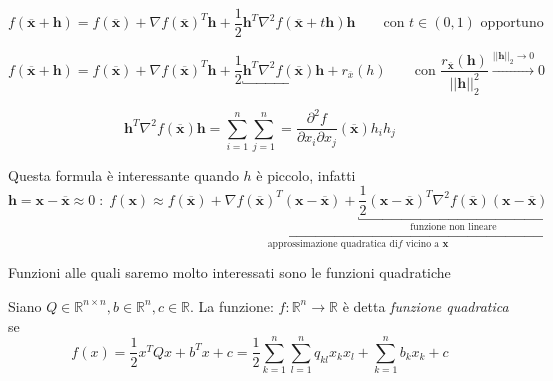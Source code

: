 \begin{defn}
 $$f(\overline{\mathbf{x}}+\mathbf{h}) = f(\overline{\mathbf{x}}) +
 \nabla f(\overline{\mathbf{x}})^T\mathbf{h} + 
 \frac{1}{2}  \mathbf{h}^T \nabla^{2} f(\overline{\mathbf{x}} +
 t  \mathbf{h}) \mathbf{h}
\qquad
\text{con } t \in (0,1) \text{ opportuno}
$$
\end{defn}

\begin{defn}
 $$f(\overline{\mathbf{x}}+\mathbf{h}) = 
f(\overline{\mathbf{x}}) +
 \nabla f(\overline{\mathbf{x}})^T\mathbf{h} + 
 \frac{1}{2} 
\underbracket{ \mathbf{h}^T \nabla^{2} f(\overline{\mathbf{x}}) \mathbf{h}}_{}
+ r_{\overline{x}}(h)
\qquad
\text{con } \dfrac{r_{\overline{\mathbf{x}}}(\mathbf{h})}{||\mathbf{h}||_{2}^{2}}
\xrightarrow{||\mathbf{h}||_{2} \to 0} 0
$$

$$\mathbf{h}^{T} \nabla^{2} f(\overline{\mathbf{x}}) \mathbf{h} =
 \displaystyle \sum_{i=1}^{n} \displaystyle \sum_{j=1}^{n}
 = \frac{{\partial}^2 f}
{{\partial} x_i {\partial} x_j}
(\overline{\mathbf{x}}) h_i h_j$$
\end{defn}
Questa formula è interessante quando $h$ è piccolo, infatti
$$ 
\mathbf{h} = \mathbf{x} - \overline{\mathbf{x}} \approx 0
\; : \;
f(\mathbf{x}) \approx
\underbracket{ f(\overline{\mathbf{x}}) + \nabla f(\overline{\mathbf{x}})^{T} (\mathbf{x}-\overline{\mathbf{x}}) + 
 \underbracket{\frac{1}{2}(\mathbf{x}- \overline{\mathbf{x}})^{T}\nabla^{2} f(\overline{\mathbf{x}})(\mathbf{x}-\overline{\mathbf{x}})}_{\text{funzione non lineare}}}_{\text{approssimazione quadratica di} f  \text{ vicino a } \mathbf{x}} $$

Funzioni alle quali saremo molto interessati sono le funzioni quadratiche
\begin{defn}
Siano $ Q \in \mathbb{R}^{n \times n}, b \in \mathbb{R}^{n}, c \in \mathbb{R} $.
La funzione: $f: \mathbb{R}^{n} \rightarrow \mathbb{R}$ \`e detta
\emph{funzione quadratica} se 
 $$ 
f(x) =  \frac{1}{2} x^{T} Q x + b^{T}x + c 
=
\frac{1}{2} 
 \displaystyle \sum_{k=1}^{n} \displaystyle \sum_{l=1}^{n}
q_{kl} x_{k}x_{l} + \displaystyle \sum_{k=1}^{n} b_k x_k + c
$$
\end{defn}

